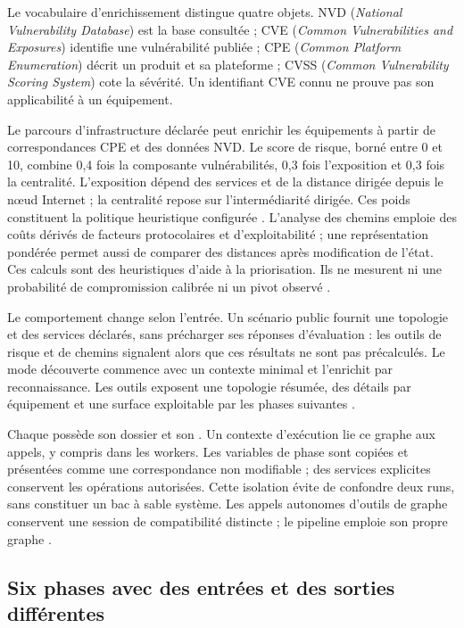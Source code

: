 \documentclass[11pt,a4paper]{article}
\DeclareRobustCommand{\code}[1]{{\small\path{#1}}}
\begin{document}
Le vocabulaire d'enrichissement distingue quatre objets. NVD
(\emph{National Vulnerability Database}) est la base consultée ; CVE
(\emph{Common Vulnerabilities and Exposures}) identifie une vulnérabilité
publiée ; CPE (\emph{Common Platform Enumeration}) décrit un produit et sa
plateforme ; CVSS (\emph{Common Vulnerability Scoring System}) cote la sévérité.
Un identifiant CVE connu ne prouve pas son applicabilité à un équipement.

Le parcours d'infrastructure déclarée peut enrichir les équipements à partir
de correspondances CPE et des données NVD. Le score de risque, borné entre 0 et 10, combine
0,4 fois la composante vulnérabilités, 0,3 fois l'exposition et 0,3 fois la
centralité. L'exposition dépend des services et de la distance dirigée depuis
le nœud Internet ; la centralité repose sur l'intermédiarité dirigée. Ces poids
constituent la politique heuristique configurée \code{directed-v2}. L'analyse des chemins emploie des coûts dérivés de facteurs protocolaires
et d'exploitabilité ; une représentation pondérée permet aussi de comparer
des distances après modification de l'état. Ces calculs sont des heuristiques
d'aide à la priorisation. Ils ne mesurent ni une probabilité de compromission
calibrée ni un pivot observé \cite{arch-cve,arch-risque,arch-chemins,arch-pondere}.

Le comportement change selon l'entrée. Un scénario public fournit une
topologie et des services déclarés, sans précharger ses réponses d'évaluation :
les outils de risque et de chemins signalent alors que ces résultats ne sont
pas précalculés. Le mode découverte commence avec un contexte minimal et
l'enrichit par reconnaissance. Les outils exposent une topologie résumée,
des détails par équipement et une surface exploitable par les phases suivantes
\cite{arch-outils-graphe}.

Chaque \code{RunContext} possède son dossier et son \code{GraphContext}. Un
contexte d'exécution lie ce graphe aux appels, y compris dans les workers.
Les variables de phase sont copiées et présentées comme une correspondance
non modifiable ; des services explicites conservent les opérations autorisées.
Cette isolation évite de confondre deux runs, sans constituer un bac à sable
système. Les appels autonomes d'outils de graphe conservent une session de
compatibilité distincte ; le pipeline emploie son propre graphe
\cite{arch-contexte,arch-graphe-contexte}.

\subsection{Six phases avec des entrées et des sorties différentes}
\end{document}
